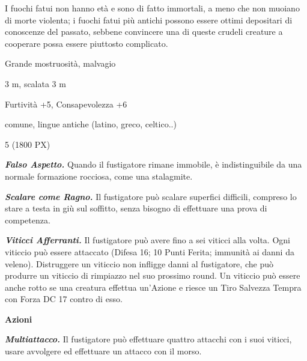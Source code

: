 \begin{multicols}{2}
{I fuochi fatui non hanno età e sono di fatto immortali, a meno che non muoiano di morte violenta; i fuochi fatui più antichi possono essere ottimi depositari di conoscenze del passato, sebbene convincere una di queste crudeli creature a cooperare possa essere piuttosto complicato.

\begin{description}[noitemsep, topsep=0pt, parsep=0pt, partopsep=0pt, itemsep=1pt, leftmargin=2.35cm,  labelwidth=2.2cm, itemindent=0cm, listparindent=0pt] %
\setlength{\baselineskip}{10pt}
\item[\textbf{Taglia/Tipo}] Grande mostruosità, malvagio
\item[\textbf{Caratt.}] 
\item[\textbf{Punti Ferita}] 
\item[\textbf{Movimento}] 3 m, scalata 3 m
\item[\textbf{Tiri Salvez.}] 
\item[\textbf{Comp.}] Furtività +5, Consapevolezza +6
\item[\textbf{Sensi}] 
\item[\textbf{Linguaggi}] comune, lingue antiche (latino, greco, celtico..)
\item[\textbf{Sfida}] 5 (1800 PX)
\end{description}
\smallskip

\emph{\textbf{Falso Aspetto.}} Quando il fustigatore rimane immobile, è indistinguibile da una normale formazione rocciosa, come una stalagmite.

\emph{\textbf{Scalare come Ragno.}} Il fustigatore può scalare superfici difficili, compreso lo stare a testa in giù sul soffitto, senza bisogno di effettuare una prova di competenza.

\emph{\textbf{Viticci Afferranti.}} Il fustigatore può avere fino a sei viticci alla volta. Ogni viticcio può essere attaccato (Difesa 16; 10 Punti Ferita; immunità ai danni da veleno). Distruggere un viticcio non infligge danni al fustigatore, che può produrre un viticcio di rimpiazzo nel suo prossimo round. Un viticcio può essere anche rotto se una creatura effettua un'Azione e riesce un Tiro Salvezza Tempra con Forza DC 17 contro di esso.

\textbf{Azioni}

\emph{\textbf{Multiattacco.}} Il fustigatore può effettuare quattro attacchi con i suoi viticci, usare avvolgere ed effettuare un attacco con il morso.

}
\end{multicols}
